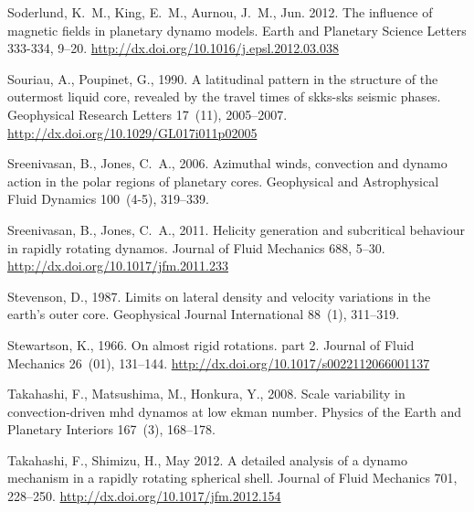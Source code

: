 \documentclass[12pt, a4paper]{article}
\begin{document}
\begin{thebibliography}{73}
Soderlund, K.~M., King, E.~M., Aurnou, J.~M., Jun. 2012. The influence of
  magnetic fields in planetary dynamo models. Earth and Planetary Science
  Letters 333-334, 9--20.
\newline\urlprefix\url{http://dx.doi.org/10.1016/j.epsl.2012.03.038}

Souriau, A., Poupinet, G., 1990. A latitudinal pattern in the structure of the
  outermost liquid core, revealed by the travel times of skks-sks seismic
  phases. Geophysical Research Letters 17~(11), 2005--2007.
\newline\urlprefix\url{http://dx.doi.org/10.1029/GL017i011p02005}

Sreenivasan, B., Jones, C.~A., 2006. Azimuthal winds, convection and dynamo
  action in the polar regions of planetary cores. Geophysical and Astrophysical
  Fluid Dynamics 100~(4-5), 319--339.

Sreenivasan, B., Jones, C.~A., 2011. Helicity generation and subcritical
  behaviour in rapidly rotating dynamos. Journal of Fluid Mechanics 688, 5--30.
\newline\urlprefix\url{http://dx.doi.org/10.1017/jfm.2011.233}

Stevenson, D., 1987. Limits on lateral density and velocity variations in the
  earth's outer core. Geophysical Journal International 88~(1), 311--319.

Stewartson, K., 1966. On almost rigid rotations. part 2. Journal of Fluid
  Mechanics 26~(01), 131--144.
\newline\urlprefix\url{http://dx.doi.org/10.1017/s0022112066001137}

Takahashi, F., Matsushima, M., Honkura, Y., 2008. Scale variability in
  convection-driven mhd dynamos at low ekman number. Physics of the Earth and
  Planetary Interiors 167~(3), 168--178.

Takahashi, F., Shimizu, H., May 2012. A detailed analysis of a dynamo mechanism
  in a rapidly rotating spherical shell. Journal of Fluid Mechanics 701,
  228--250.
\newline\urlprefix\url{http://dx.doi.org/10.1017/jfm.2012.154}


\end{thebibliography}
\end{document}
